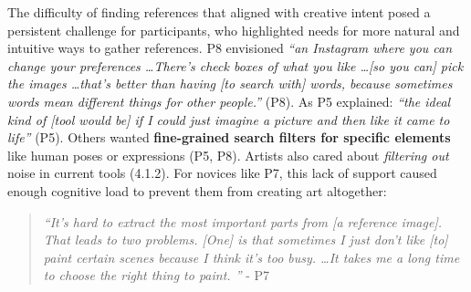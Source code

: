 The difficulty of finding references that aligned with creative intent posed a persistent challenge for participants, who highlighted needs for more natural and intuitive ways to gather references. P8 envisioned
    \textit{``an Instagram where you can change your preferences \dots There's check boxes of what you like \dots [so you can] pick the images \dots that's better than having [to search with] words, because sometimes words mean different things for other people.''} (P8).
As P5 explained: \textit{``the ideal kind of [tool would be] if I could just imagine a picture and then like it came to life''} (P5). Others wanted \textbf{fine-grained search filters for specific elements} like human poses or expressions (P5, P8). 
Artists also cared about \textit{filtering out} noise in current tools (4.1.2). For novices like P7, this lack of support caused enough cognitive load to prevent them from creating art altogether:
\begin{quote}
    \textit{``It's hard to extract the most important parts from [a reference image]. That leads to two problems. [One] is that sometimes I just don't like [to] paint certain scenes because I think it's too busy. \dots It takes me a long time to choose the right thing to paint. ''} - P7
\end{quote}

